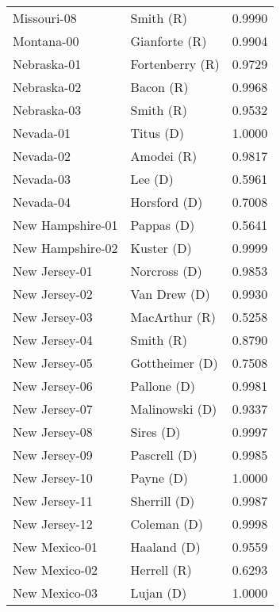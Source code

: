 \begin{longtable}{llr}
       Missouri-08 &            Smith (R) &       0.9990 \\
        Montana-00 &        Gianforte (R) &       0.9904 \\
       Nebraska-01 &      Fortenberry (R) &       0.9729 \\
       Nebraska-02 &            Bacon (R) &       0.9968 \\
       Nebraska-03 &            Smith (R) &       0.9532 \\
         Nevada-01 &            Titus (D) &       1.0000 \\
         Nevada-02 &           Amodei (R) &       0.9817 \\
         Nevada-03 &              Lee (D) &       0.5961 \\
         Nevada-04 &         Horsford (D) &       0.7008 \\
  New Hampshire-01 &           Pappas (D) &       0.5641 \\
  New Hampshire-02 &           Kuster (D) &       0.9999 \\
     New Jersey-01 &         Norcross (D) &       0.9853 \\
     New Jersey-02 &         Van Drew (D) &       0.9930 \\
     New Jersey-03 &        MacArthur (R) &       0.5258 \\
     New Jersey-04 &            Smith (R) &       0.8790 \\
     New Jersey-05 &       Gottheimer (D) &       0.7508 \\
     New Jersey-06 &          Pallone (D) &       0.9981 \\
     New Jersey-07 &       Malinowski (D) &       0.9337 \\
     New Jersey-08 &            Sires (D) &       0.9997 \\
     New Jersey-09 &         Pascrell (D) &       0.9985 \\
     New Jersey-10 &            Payne (D) &       1.0000 \\
     New Jersey-11 &         Sherrill (D) &       0.9987 \\
     New Jersey-12 &          Coleman (D) &       0.9998 \\
     New Mexico-01 &          Haaland (D) &       0.9559 \\
     New Mexico-02 &          Herrell (R) &       0.6293 \\
     New Mexico-03 &            Lujan (D) &       1.0000 \\

\end{longtable}
